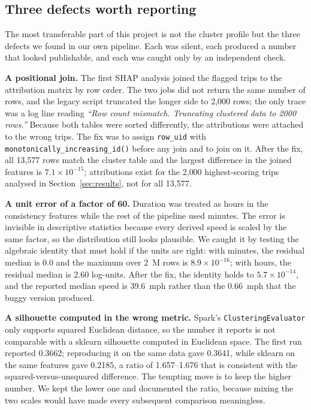 \documentclass[11pt,a4paper]{article}
\newcommand{\code}[1]{\texttt{\small #1}}
\begin{document}
\subsection{Three defects worth reporting}
\label{sec:bugs}

The most transferable part of this project is not the cluster profile but the three defects we found in our own pipeline. Each was silent, each produced a number that looked publishable, and each was caught only by an independent check.

\textbf{A positional join.} The first SHAP analysis joined the flagged trips to the attribution matrix by row order. The two jobs did not return the same number of rows, and the legacy script truncated the longer side to 2{,}000 rows; the only trace was a log line reading \emph{``Row count mismatch. Truncating clustered data to 2000 rows.''} Because both tables were sorted differently, the attributions were attached to the wrong trips. The fix was to assign \code{row\_uid} with \code{monotonically\_increasing\_id()} before any join and to join on it. After the fix, all 13{,}577 rows match the cluster table and the largest difference in the joined features is $7.1 \times 10^{-15}$; attributions exist for the 2{,}000 highest-scoring trips analysed in Section~\ref{sec:results}, not for all 13{,}577.

\textbf{A unit error of a factor of 60.} Duration was treated as hours in the consistency features while the rest of the pipeline used minutes. The error is invisible in descriptive statistics because every derived speed is scaled by the same factor, so the distribution still looks plausible. We caught it by testing the algebraic identity that must hold if the units are right: with minutes, the residual median is 0.0 and the maximum over 2~M rows is $8.9 \times 10^{-16}$; with hours, the residual median is 2.60 log-units. After the fix, the identity holds to $5.7 \times 10^{-14}$, and the reported median speed is 39.6~mph rather than the 0.66~mph that the buggy version produced.

\textbf{A silhouette computed in the wrong metric.} Spark's \code{ClusteringEvaluator} only supports squared Euclidean distance, so the number it reports is not comparable with a sklearn silhouette computed in Euclidean space. The first run reported 0.3662; reproducing it on the same data gave 0.3641, while sklearn on the same features gave 0.2185, a ratio of 1.657--1.676 that is consistent with the squared-versus-unsquared difference. The tempting move is to keep the higher number. We kept the lower one and documented the ratio, because mixing the two scales would have made every subsequent comparison meaningless.
\end{document}
